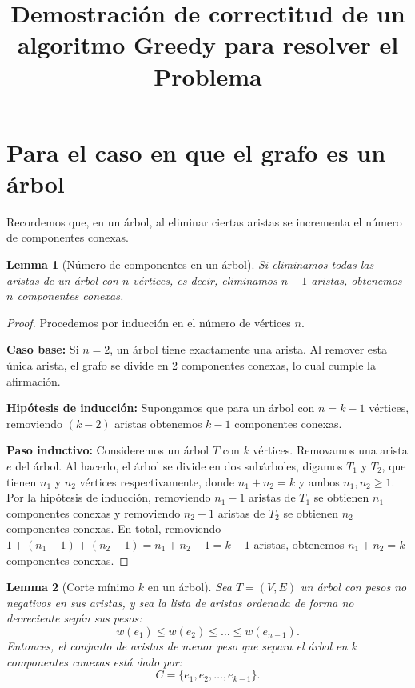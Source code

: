 \documentclass[12pt]{article}
\title{Demostración de correctitud de un algoritmo Greedy para resolver el Problema}
\author{}
\date{}
\newtheorem{lemma}{Lemma}
\begin{document}
\maketitle






\section{Para el caso en que el grafo es un árbol}

Recordemos que, en un árbol, al eliminar ciertas aristas se incrementa el número de componentes conexas.

\begin{lemma}[Número de componentes en un árbol]
Si eliminamos todas las aristas de un árbol con \( n \) vértices, es decir, eliminamos \( n-1 \) aristas, obtenemos \( n \) componentes conexas.
\end{lemma}

\begin{proof}
Procedemos por inducción en el número de vértices \( n \).

\textbf{Caso base:}  
Si \( n = 2 \), un árbol tiene exactamente una arista. Al remover esta única arista, el grafo se divide en 2 componentes conexas, lo cual cumple la afirmación.

\textbf{Hipótesis de inducción:}  
Supongamos que para un árbol con \( n = k-1 \) vértices, removiendo \( (k-2) \) aristas obtenemos \( k-1 \) componentes conexas.

\textbf{Paso inductivo:}  
Consideremos un árbol \( T \) con \( k \) vértices. Removamos una arista \( e \) del árbol. Al hacerlo, el árbol se divide en dos subárboles, digamos \( T_1 \) y \( T_2 \), que tienen \( n_1 \) y \( n_2 \) vértices respectivamente, donde \( n_1 + n_2 = k \) y ambos \( n_1, n_2 \ge 1 \).  
Por la hipótesis de inducción, removiendo \( n_1 - 1 \) aristas de \( T_1 \) se obtienen \( n_1 \) componentes conexas y removiendo \( n_2 - 1 \) aristas de \( T_2 \) se obtienen \( n_2 \) componentes conexas.  
En total, removiendo \( 1 + (n_1 - 1) + (n_2 - 1) = n_1 + n_2 - 1 = k - 1 \) aristas, obtenemos \( n_1 + n_2 = k \) componentes conexas.  
\end{proof}

\begin{lemma}[Corte mínimo \( k \) en un árbol]
Sea \( T = (V, E) \) un árbol con pesos no negativos en sus aristas, y sea la lista de aristas ordenada de forma no decreciente según sus pesos:
\[
w(e_1) \le w(e_2) \le \dots \le w(e_{n-1}).
\]
Entonces, el conjunto de aristas de menor peso que separa el árbol en \( k \) componentes conexas está dado por:
\[
C = \{ e_1, e_2, \dots, e_{k-1} \}.
\]
\end{lemma}
\end{document}
